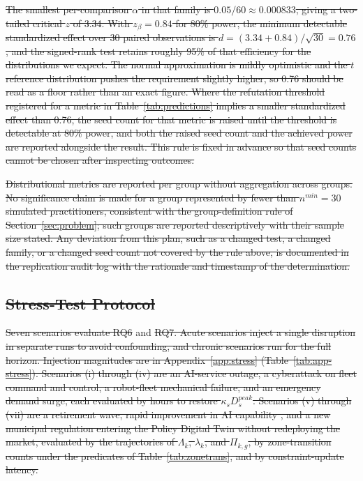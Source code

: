 \documentclass[utf8]{FrontiersinHarvard}
\providecommand{\DIFadd}[1]{{\protect\color{blue}\uwave{#1}}} %
\providecommand{\DIFdel}[1]{{\protect\color{red}\sout{#1}}}                      %
\providecommand{\DIFaddbegin}{} %
\providecommand{\DIFaddend}{} %
\providecommand{\DIFdelbegin}{} %
\providecommand{\DIFdelend}{} %
\begin{document}
\DIFdel{The smallest per-comparison $\alpha$ in that family is $0.05/60 \approx 0.000833$, giving a two-tailed critical $z$ of 3.34. With $z_\beta = 0.84$ for 80\% power, the minimum detectable standardized effect over 30 paired observations is $d = (3.34+0.84)/\sqrt{30} = 0.76$, and the signed-rank test retains roughly 95\% of that efficiency for the distributions we expect. The normal approximation is mildly optimistic and the $t$ reference distribution pushes the requirement slightly higher, so 0.76 should be read as a floor rather than an exact figure. Where the refutation threshold registered for a metric in Table~\ref{tab:predictions} implies a smaller standardized effect than 0.76, the seed count for that metric is raised until the threshold is detectable at 80\% power, and both the raised seed count and the achieved power are reported alongside the result. This rule is fixed in advance so that seed counts cannot be chosen after inspecting outcomes.
	}%

\DIFdel{Distributional metrics are reported per group without aggregation across groups. No significance claim is made for a group represented by fewer than $n^{min}=30$ simulated practitioners, consistent with the group-definition rule of Section~\ref{sec:problem}; such groups are reported descriptively with their sample size stated. Any deviation from this plan, such as a changed test, a changed family, or a changed seed count not covered by the rule above, is documented in the replication audit log with the rationale and timestamp of the determination.
	}%

\subsection{\DIFdel{Stress-Test Protocol}}
\addtocounter{subsection}{-1}%

\DIFdel{Seven scenarios evaluate RQ6 }\DIFdelend \DIFaddbegin \DIFadd{806.08 hours }\DIFaddend and \DIFdelbegin \DIFdel{RQ7. Acute scenarios inject a single disruption in separate runs to avoid confounding, and chronic scenarios run for the full horizon. Injection magnitudes are in Appendix~\ref{app:stress} (Table~\ref{tab:app-stress}). Scenarios (i) through (iv) are an AI-service outage, a cyberattack on fleet command and control, a robot-fleet mechanical failure, and an emergency demand surge, each evaluated by hours to restore $\kappa_s D^{peak}_s$. Scenarios (v) through (vii) are a retirement wave, rapid improvement in AI capability , and a new municipal regulation entering the Policy Digital Twin without redeploying the market, evaluated by the trajectories of $\Lambda_k$, $\lambda_k$, and $\Pi_{k,g}$, by zone-transition counts under the predicates of Table~\ref{tab:zonetrans}, and by constraint-update latency.
	}%
\end{document}
